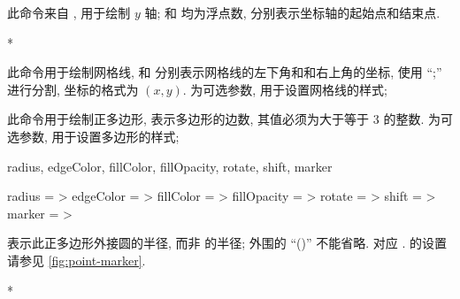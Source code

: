 \documentclass[
  hyper, lang=cn, 
  class=l3dox, 
]{../../zlatex/code/ztex}
\begin{document}
\begin{function}[added=2025-05-15]{\yAxis}
  \begin{syntax}
  \end{syntax}
  此命令来自 , 用于绘制 $y$ 轴;  和  均为浮点数, 分别表示坐标轴的起始点和结束点.
\end{function}
\begin{DocExample}*
\end{DocExample}



\begin{function}[added=2025-05-15]{\ShowGrid}
  \begin{syntax}
  \end{syntax}
  此命令用于绘制网格线,  和  分别表示网格线的左下角和和右上角的坐标, 使用 ``;'' 进行分割, 
  坐标的格式为 $(x, y)$.  为可选参数, 用于设置网格线的样式;
\end{function}


\begin{function}[added=2025-05-15]{\Polygon}
  \begin{syntax}
  \end{syntax}
  此命令用于绘制正多边形,  表示多边形的边数, 其值必须为大于等于 3 的整数.
   为可选参数, 用于设置多边形的样式;
\end{function}


\begin{keyval}[parent=ztikz/polygon]{
  radius, edgeColor, fillColor, fillOpacity, 
  rotate, shift, marker}
  \begin{syntax}
    radius      = >
    edgeColor   = >
    fillColor   = >
    fillOpacity = >
    rotate      = >
    shift       = >
    marker      = >
  \end{syntax}
   表示此正多边形外接圆的半径, 而非  的半径; 
  外围的 ``()'' 不能省略.  对应 .  的设置
  请参见 \cref{fig:point-marker}.
\end{keyval}
\begin{DocExample}*
\end{DocExample}
\end{document}
